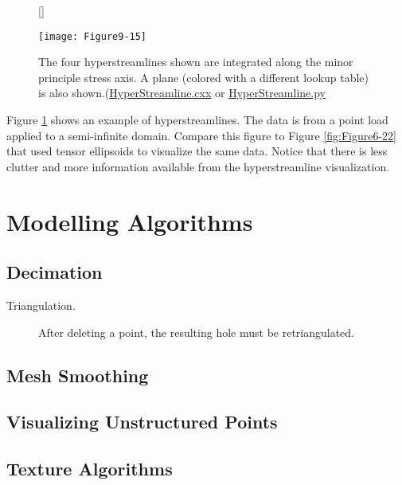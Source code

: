 \begin{figure}[!htb]
	[\FBwidth]
	{\caption{The four hyperstreamlines shown are integrated along the minor principle stress axis. A plane (colored with a different lookup table) is also shown.(\href{https://lorensen.github.io/VTKExamples/site/Cxx/VisualizationAlgorithms/HyperStreamline/}{HyperStreamline.cxx} or \href{https://lorensen.github.io/VTKExamples/site/Python/VisualizationAlgorithms/HyperStreamline/}{HyperStreamline.py}}\label{fig:Figure9-15}}
	{\texttt{[image: Figure9-15]}}
\end{figure}


Figure \ref{fig:Figure9-15} shows an example of hyperstreamlines. The data is from a point load applied to a semi-infinite domain. Compare this figure to Figure \ref{fig:Figure6-22} that used tensor ellipsoids to visualize the same data. Notice that there is less clutter and more information available from the hyperstreamline visualization.



\section{Modelling Algorithms}

\subsection{Decimation}

\begin{description}
	\item[Triangulation.] \label{subsec:decimation.triangulation} After deleting a point, the resulting hole must be retriangulated.
\end{description}

\subsection{Mesh Smoothing}
\label{subsec:mesh_smoothing}

\subsection{Visualizing Unstructured Points}
\label{subsec:visualizing_unstructured_points}

\subsection{Texture Algorithms}
\label{subsec:texture_algorithms}

